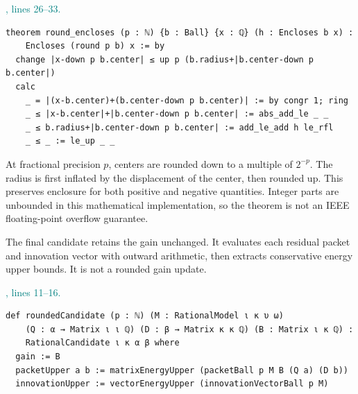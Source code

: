 \documentclass[11pt]{article}\usepackage{needspace}\renewcommand{\paperkind}{Lean companion}\setlength{\parskip}{0.35em}
\begin{document}
{\small\textcolor{teal}{, lines 26--33.}\par}

\begin{lstlisting}[style=BayesSource]
theorem round_encloses (p : ℕ) {b : Ball} {x : ℚ} (h : Encloses b x) :
    Encloses (round p b) x := by
  change |x-down p b.center| ≤ up p (b.radius+|b.center-down p b.center|)
  calc
    _ = |(x-b.center)+(b.center-down p b.center)| := by congr 1; ring
    _ ≤ |x-b.center|+|b.center-down p b.center| := abs_add_le _ _
    _ ≤ b.radius+|b.center-down p b.center| := add_le_add h le_rfl
    _ ≤ _ := le_up _ _
\end{lstlisting}

At fractional precision $p$, centers are rounded down to a multiple of $2^{-p}$. The radius is first inflated by the displacement of the center, then rounded up. This preserves enclosure for both positive and negative quantities. Integer parts are unbounded in this mathematical implementation, so the theorem is not an IEEE floating-point overflow guarantee.

The final candidate retains the gain unchanged. It evaluates each residual packet and innovation vector with outward arithmetic, then extracts conservative energy upper bounds. It is not a rounded gain update.



{\small\textcolor{teal}{, lines 11--16.}\par}

\begin{lstlisting}[style=BayesSource]
def roundedCandidate (p : ℕ) (M : RationalModel ι κ υ ω)
    (Q : α → Matrix ι ι ℚ) (D : β → Matrix κ κ ℚ) (B : Matrix ι κ ℚ) :
    RationalCandidate ι κ α β where
  gain := B
  packetUpper a b := matrixEnergyUpper (packetBall p M B (Q a) (D b))
  innovationUpper := vectorEnergyUpper (innovationVectorBall p M)
\end{lstlisting}


\end{document}

